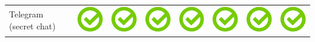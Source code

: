 \documentclass[10pt,foldmark,tumble]{leaflet}
\begin{document}
\begin{center}
{{\begin{tabular}{ L{2cm} | C{2cm} | C{2cm} | C{2cm} | C{2cm} | C{2cm} | C{2cm} | C{2cm} }
Telegram (secret chat) & \includegraphics[scale=0.1]{pics/haken.png} & \includegraphics[scale=0.1]{pics/haken.png} & \includegraphics[scale=0.1]{pics/haken.png} & \includegraphics[scale=0.1]{pics/haken.png} & \includegraphics[scale=0.1]{pics/haken.png} & \includegraphics[scale=0.1]{pics/haken.png} & \includegraphics[scale=0.1]{pics/haken.png} \tabularnewline

\end{tabular}}}
\end{center}
\end{document}
